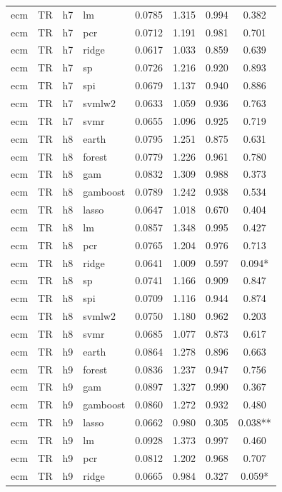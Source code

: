\begin{ThreePartTable}
\begin{longtable}[t]{llclcccc}
ecm & TR & h7 & lm & 0.0785 & 1.315 & 0.994 & 0.382\\
ecm & TR & h7 & pcr & 0.0712 & 1.191 & 0.981 & 0.701\\
ecm & TR & h7 & ridge & 0.0617 & 1.033 & 0.859 & 0.639\\
ecm & TR & h7 & sp & 0.0726 & 1.216 & 0.920 & 0.893\\
ecm & TR & h7 & spi & 0.0679 & 1.137 & 0.940 & 0.886\\
ecm & TR & h7 & svmlw2 & 0.0633 & 1.059 & 0.936 & 0.763\\
ecm & TR & h7 & svmr & 0.0655 & 1.096 & 0.925 & 0.719\\
\addlinespace
ecm & TR & h8 & earth & 0.0795 & 1.251 & 0.875 & 0.631\\
ecm & TR & h8 & forest & 0.0779 & 1.226 & 0.961 & 0.780\\
ecm & TR & h8 & gam & 0.0832 & 1.309 & 0.988 & 0.373\\
ecm & TR & h8 & gamboost & 0.0789 & 1.242 & 0.938 & 0.534\\
ecm & TR & h8 & lasso & 0.0647 & 1.018 & 0.670 & 0.404\\
ecm & TR & h8 & lm & 0.0857 & 1.348 & 0.995 & 0.427\\
ecm & TR & h8 & pcr & 0.0765 & 1.204 & 0.976 & 0.713\\
ecm & TR & h8 & ridge & 0.0641 & 1.009 & 0.597 & 0.094*\\
ecm & TR & h8 & sp & 0.0741 & 1.166 & 0.909 & 0.847\\
ecm & TR & h8 & spi & 0.0709 & 1.116 & 0.944 & 0.874\\
ecm & TR & h8 & svmlw2 & 0.0750 & 1.180 & 0.962 & 0.203\\
ecm & TR & h8 & svmr & 0.0685 & 1.077 & 0.873 & 0.617\\
\addlinespace
ecm & TR & h9 & earth & 0.0864 & 1.278 & 0.896 & 0.663\\
ecm & TR & h9 & forest & 0.0836 & 1.237 & 0.947 & 0.756\\
ecm & TR & h9 & gam & 0.0897 & 1.327 & 0.990 & 0.367\\
ecm & TR & h9 & gamboost & 0.0860 & 1.272 & 0.932 & 0.480\\
ecm & TR & h9 & lasso & 0.0662 & 0.980 & 0.305 & 0.038**\\
ecm & TR & h9 & lm & 0.0928 & 1.373 & 0.997 & 0.460\\
ecm & TR & h9 & pcr & 0.0812 & 1.202 & 0.968 & 0.707\\
ecm & TR & h9 & ridge & 0.0665 & 0.984 & 0.327 & 0.059*\\

\end{longtable}
\end{ThreePartTable}
